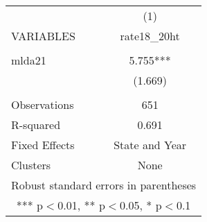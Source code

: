 \begin{tabular}{lc} \hline
 & (1) \\
VARIABLES & rate18\_20ht \\ \hline
 &  \\
mlda21 & 5.755*** \\
 & (1.669) \\
 &  \\
Observations & 651 \\
R-squared & 0.691 \\
Fixed Effects & State and Year \\
 Clusters & None \\ \hline
\multicolumn{2}{c}{ Robust standard errors in parentheses} \\
\multicolumn{2}{c}{ *** p$<$0.01, ** p$<$0.05, * p$<$0.1} \\
\end{tabular}
